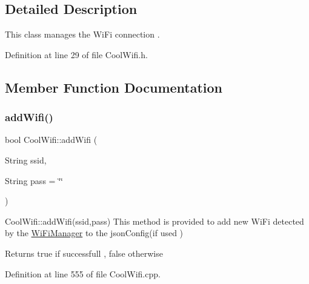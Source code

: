 \subsection{Detailed Description}
This class manages the Wi\+Fi connection . 

Definition at line 29 of file Cool\+Wifi.\+h.



\subsection{Member Function Documentation}
\mbox{\label{class_cool_wifi_a914d7a1df14dd6b75345fb614c34e9d6}} 
\subsubsection{\texorpdfstring{add\+Wifi()}{addWifi()}}
{\footnotesize\ttfamily bool Cool\+Wifi\+::add\+Wifi (\begin{DoxyParamCaption}\item[{String}]{ssid,  }\item[{String}]{pass = {\ttfamily \char`\"{}\char`\"{}} }\end{DoxyParamCaption})}

Cool\+Wifi\+::add\+Wifi(ssid,pass) This method is provided to add new Wi\+Fi detected by the \hyperlink{class_wi_fi_manager}{Wi\+Fi\+Manager} to the json\+Config(if used )

\begin{DoxyReturn}{Returns}
true if successfull , false otherwise 
\end{DoxyReturn}


Definition at line 555 of file Cool\+Wifi.\+cpp.



